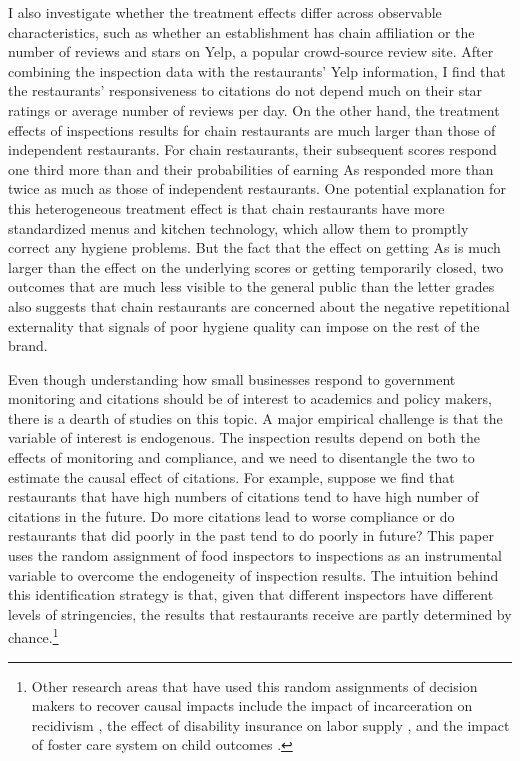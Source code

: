 \documentclass[12pt]{article}
\begin{document}
I also investigate whether the treatment effects differ across observable characteristics, such as whether an establishment has chain affiliation or the number of reviews and stars on Yelp, a popular crowd-source review site. After combining the inspection data with the restaurants' Yelp information, I find that the restaurants' responsiveness to citations do not depend much on their star ratings or average number of reviews per day. On the other hand, the treatment effects of inspections results for chain restaurants are much larger than those of independent restaurants. For chain restaurants, their subsequent scores respond one third more than and their probabilities of earning As responded more than twice as much as those of independent restaurants. One potential explanation for this heterogeneous treatment effect is that chain restaurants have more standardized menus and kitchen technology, which allow them to promptly correct any hygiene problems. But the fact that the effect on getting As is much larger than the effect on the underlying scores or getting temporarily closed, two outcomes that are much less visible to the general public than the letter grades also suggests that chain restaurants are concerned about the negative repetitional externality that signals of poor hygiene quality can impose on the rest of the brand. 

Even though understanding how small businesses respond to government monitoring and citations should be of interest to academics and policy makers, there is a dearth of studies on this topic. A major empirical challenge is that the variable of interest is endogenous. The inspection results depend on both the effects of monitoring and compliance, and we need to disentangle the two to estimate the causal effect of citations. For example, suppose we find that restaurants that have high numbers of citations tend to have high number of citations in the future. Do more citations lead to worse compliance or do restaurants that did poorly in the past tend to do poorly in future? This paper uses the random assignment of food inspectors to inspections as an instrumental variable to overcome the endogeneity of inspection results. The intuition behind this identification strategy is that, given that different inspectors have different levels of stringencies, the results that restaurants receive are partly determined by chance.\footnote{Other research areas that have used this random assignments of decision makers to recover causal impacts include the impact of incarceration on recidivism \citep{bhuller_16}, the effect of disability insurance on labor supply \citep{Maestas_13}, and the impact of foster care system on child outcomes \citep{Doyle_07}.}
\end{document}
